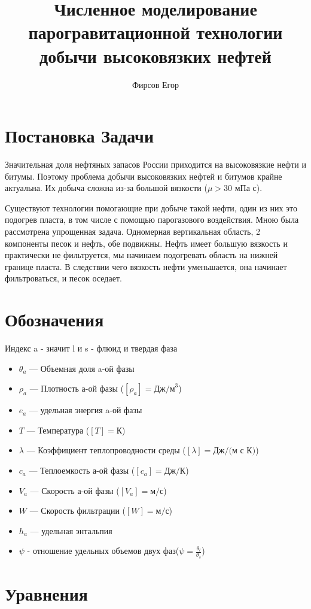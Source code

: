 \documentclass[12pt]{article}
\title{Численное моделирование парогравитационной технологии добычи высоковязких нефтей}
\author{Фирсов Егор}
\begin{document}
\maketitle
\newpage
\section*{Постановка Задачи}
Значительная доля нефтяных запасов России приходится на высоковязкие нефти и битумы. Поэтому проблема добычи высоковязких нефтей и битумов крайне актуальна. Их добыча сложна из-за большой вязкости ($\mu > 30$ мПа с). 

Существуют технологии помогающие при добыче такой нефти, один из них это подогрев пласта, в том числе с помощью парогазового воздействия. Мною была рассмотрена упрощенная задача. Одномерная вертикальная область, 2 компоненты песок и нефть, обе подвижны. Нефть имеет большую вязкость и практически не фильтруется, мы начинаем подогревать область на нижней границе пласта. В следствии чего вязкость нефти уменьшается, она начинает фильтроваться, и песок оседает.


\newpage
\section*{Обозначения}
Индекс a - значит l и s - флюид и твердая фаза
\begin{itemize}
\item $\theta_a $ --- Объемная доля a-ой фазы
\item $\rho_a$ --- Плотность а-ой фазы ($[\rho_a] = \text{Дж/м}^3$)
\item $e_a$ --- удельная энергия a-ой фазы
\item $T $ --- Температура ($[T] =\text{К}$)
\item $\lambda$ --- Коэффициент теплопроводности среды ($[\lambda] = \text{Дж/(м с К)}$)
\item $c_a$ --- Теплоемкость а-ой фазы ($[c_a] = \text{Дж/К}$)
\item $V_a$ --- Скорость а-ой фазы ($[V_a] = \text{м/с} $)
\item $W$ --- Скорость фильтрации ($[W] = \text{м/с} $)
\item $h_a$ --- удельная энтальпия
\item $\psi$ - отношение удельных объемов двух фаз($\psi = \frac{\theta_l}{\theta_s} $)
\end{itemize}


\newpage
\section*{Уравнения}
\end{document}
